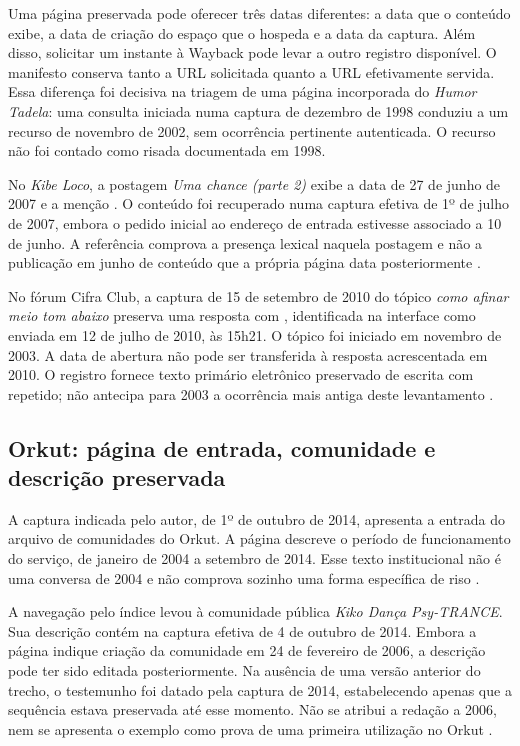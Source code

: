 Uma página preservada pode oferecer três datas diferentes: a data que o conteúdo exibe, a data de criação do espaço que o hospeda e a data da captura. Além disso, solicitar um instante à Wayback pode levar a outro registro disponível. O manifesto conserva tanto a URL solicitada quanto a URL efetivamente servida. Essa diferença foi decisiva na triagem de uma página incorporada do \textit{Humor Tadela}: uma consulta iniciada numa captura de dezembro de 1998 conduziu a um recurso de novembro de 2002, sem ocorrência pertinente autenticada. O recurso não foi contado como risada documentada em 1998.

No \textit{Kibe Loco}, a postagem \textit{Uma chance (parte 2)} exibe a data de 27 de junho de 2007 e a menção . O conteúdo foi recuperado numa captura efetiva de 1º de julho de 2007, embora o pedido inicial ao endereço de entrada estivesse associado a 10 de junho. A referência comprova a presença lexical naquela postagem e não a publicação em junho de conteúdo que a própria página data posteriormente \cite{r4kibeloco}.

No fórum Cifra Club, a captura de 15 de setembro de 2010 do tópico \textit{como afinar meio tom abaixo} preserva uma resposta com , identificada na interface como enviada em 12 de julho de 2010, às 15h21. O tópico foi iniciado em novembro de 2003. A data de abertura não pode ser transferida à resposta acrescentada em 2010. O registro fornece texto primário eletrônico preservado de escrita com  repetido; não antecipa para 2003 a ocorrência mais antiga deste levantamento \cite{r4forumcifraclub}.

\subsection{Orkut: página de entrada, comunidade e descrição preservada}

A captura indicada pelo autor, de 1º de outubro de 2014, apresenta a entrada do arquivo de comunidades do Orkut. A página descreve o período de funcionamento do serviço, de janeiro de 2004 a setembro de 2014. Esse texto institucional não é uma conversa de 2004 e não comprova sozinho uma forma específica de riso \cite{r4orkutindex}.

A navegação pelo índice levou à comunidade pública \textit{Kiko Dança Psy-TRANCE}. Sua descrição contém  na captura efetiva de 4 de outubro de 2014. Embora a página indique criação da comunidade em 24 de fevereiro de 2006, a descrição pode ter sido editada posteriormente. Na ausência de uma versão anterior do trecho, o testemunho foi datado pela captura de 2014, estabelecendo apenas que a sequência estava preservada até esse momento. Não se atribui a redação a 2006, nem se apresenta o exemplo como prova de uma primeira utilização no Orkut \cite{r4orkutcomunidades}.

